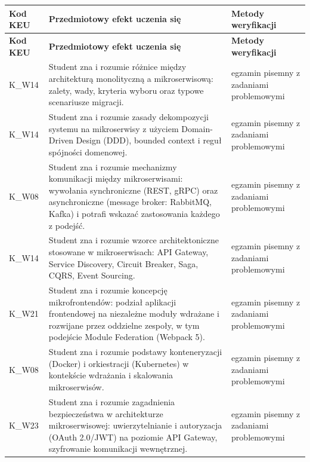 \documentclass[12pt, a4paper]{article}
\newcommand{\thdrule}{\noalign{\global\setlength{\extrarowheight}{0pt}}}
\newcommand{\thdend}{\noalign{\global\setlength{\extrarowheight}{3pt}}}
\begin{document}
{\scriptsize
\begin{longtable}{m{1.6cm}m{9.0cm}m{4.2cm}}
\thdrule\toprule
\rowcolor{pjatkRed} {\color{white}\footnotesize\textbf{\vphantom{Ag}Kod KEU}} & {\color{white}\footnotesize\textbf{\vphantom{Ag}Przedmiotowy efekt uczenia się}} & {\color{white}\footnotesize\textbf{\vphantom{Ag}Metody weryfikacji}} \\
\midrule\thdend
\endfirsthead
\thdrule\toprule
\rowcolor{pjatkRed} {\color{white}\footnotesize\textbf{\vphantom{Ag}Kod KEU}} & {\color{white}\footnotesize\textbf{\vphantom{Ag}Przedmiotowy efekt uczenia się}} & {\color{white}\footnotesize\textbf{\vphantom{Ag}Metody weryfikacji}} \\
\midrule\thdend
\endhead
  \rowcolor{tableRowLight} K\_W14 & Student zna i rozumie różnice między architekturą monolityczną a mikroserwisową: zalety, wady, kryteria wyboru oraz typowe scenariusze migracji. & egzamin pisemny z zadaniami problemowymi \\
  \rowcolor{tableRowAlt} K\_W14 & Student zna i rozumie zasady dekompozycji systemu na mikroserwisy z użyciem Domain-Driven Design (DDD), bounded context i reguł spójności domenowej. & egzamin pisemny z zadaniami problemowymi \\
  \rowcolor{tableRowLight} K\_W08 & Student zna i rozumie mechanizmy komunikacji między mikroserwisami: wywołania synchroniczne (REST, gRPC) oraz asynchroniczne (message broker: RabbitMQ, Kafka) i potrafi wskazać zastosowania każdego z podejść. & egzamin pisemny z zadaniami problemowymi \\
  \rowcolor{tableRowAlt} K\_W14 & Student zna i rozumie wzorce architektoniczne stosowane w mikroserwisach: API Gateway, Service Discovery, Circuit Breaker, Saga, CQRS, Event Sourcing. & egzamin pisemny z zadaniami problemowymi \\
  \rowcolor{tableRowLight} K\_W21 & Student zna i rozumie koncepcję mikrofrontendów: podział aplikacji frontendowej na niezależne moduły wdrażane i rozwijane przez oddzielne zespoły, w tym podejście Module Federation (Webpack 5). & egzamin pisemny z zadaniami problemowymi \\
  \rowcolor{tableRowAlt} K\_W08 & Student zna i rozumie podstawy konteneryzacji (Docker) i orkiestracji (Kubernetes) w kontekście wdrażania i skalowania mikroserwisów. & egzamin pisemny z zadaniami problemowymi \\
  \rowcolor{tableRowLight} K\_W23 & Student zna i rozumie zagadnienia bezpieczeństwa w architekturze mikroserwisowej: uwierzytelnianie i autoryzacja (OAuth 2.0/JWT) na poziomie API Gateway, szyfrowanie komunikacji wewnętrznej. & egzamin pisemny z zadaniami problemowymi \\
\bottomrule
\end{longtable}}
\end{document}
